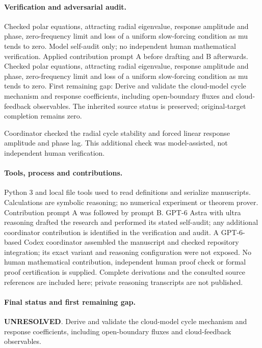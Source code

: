\documentclass[11pt]{article}
\begin{document}
\paragraph{Verification and adversarial audit.}
Checked polar equations, attracting radial eigenvalue, response amplitude and phase, zero-frequency limit and loss of a uniform slow-forcing condition as mu tends to zero. Model self-audit only; no independent human mathematical verification. Applied contribution prompt A before drafting and B afterwards. Checked polar equations, attracting radial eigenvalue, response amplitude and phase, zero-frequency limit and loss of a uniform slow-forcing condition as mu tends to zero. First remaining gap: Derive and validate the cloud-model cycle mechanism and response coefficients, including open-boundary fluxes and cloud-feedback observables. The inherited source status is preserved; original-target completion remains zero.

Coordinator checked the radial cycle stability and forced linear response amplitude and phase lag. This additional check was model-assisted, not independent human verification.

\paragraph{Tools, process and contributions.}
Python 3 and local file tools used to read definitions and serialize manuscripts. Calculations are symbolic reasoning; no numerical experiment or theorem prover. Contribution prompt A was followed by prompt B. GPT-6 Astra with ultra reasoning drafted the research and performed its stated self-audit; any additional coordinator contribution is identified in the verification and audit. A GPT-6-based Codex coordinator assembled the manuscript and checked repository integration; its exact variant and reasoning configuration were not exposed. No human mathematical contribution, independent human proof check or formal proof certification is supplied. Complete derivations and the consulted source references are included here; private reasoning transcripts are not published.

\paragraph{Final status and first remaining gap.}
\textbf{UNRESOLVED}. Derive and validate the cloud-model cycle mechanism and response coefficients, including open-boundary fluxes and cloud-feedback observables.
\end{document}

